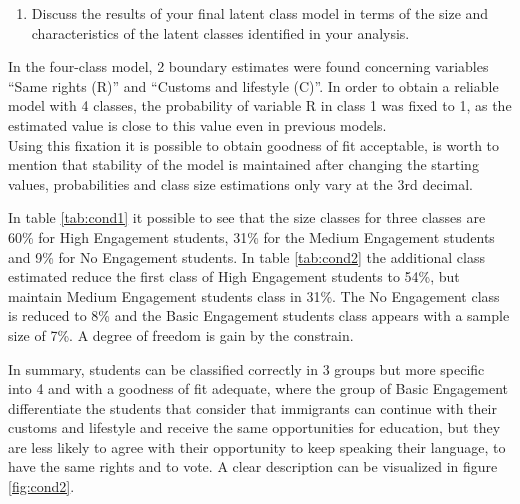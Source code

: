 \documentclass[
  12pt,
]{article}
\providecommand{\tightlist}{%
  \setlength{\itemsep}{0pt}\setlength{\parskip}{0pt}}
\begin{document}
\begin{enumerate}
\def\labelenumi{\arabic{enumi}.}
\setcounter{enumi}{2}
\tightlist
\item
  Discuss the results of your final latent class model in terms of the size and characteristics of the latent classes identified in your analysis.
\end{enumerate}

In the four-class model, 2 boundary estimates were found concerning variables ``Same rights (R)'' and ``Customs and lifestyle (C)''. In order to obtain a reliable model with 4 classes, the probability of variable R in class 1 was fixed to 1, as the estimated value is close to this value even in previous models.\\
Using this fixation it is possible to obtain goodness of fit acceptable, is worth to mention that stability of the model is maintained after changing the starting values, probabilities and class size estimations only vary at the 3rd decimal.

In table \ref{tab:cond1} it possible to see that the size classes for three classes are 60\% for High Engagement students, 31\% for the Medium Engagement students and 9\% for No Engagement students. In table \ref{tab:cond2} the additional class estimated reduce the first class of High Engagement students to 54\%, but maintain Medium Engagement students class in 31\%. The No Engagement class is reduced to 8\% and the Basic Engagement students class appears with a sample size of 7\%. A degree of freedom is gain by the constrain.

In summary, students can be classified correctly in 3 groups but more specific into 4 and with a goodness of fit adequate, where the group of Basic Engagement differentiate the students that consider that immigrants can continue with their customs and lifestyle and receive the same opportunities for education, but they are less likely to agree with their opportunity to keep speaking their language, to have the same rights and to vote. A clear description can be visualized in figure \ref{fig:cond2}.
\end{document}
